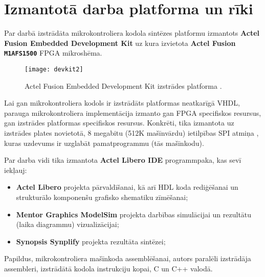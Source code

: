 \section{Izmantotā darba platforma un rīki} \label{sec:devkit}
Par darbā izstrādāta mikrokontroliera kodola sintēzes platformu izmantots
\textbf{Actel Fusion Embedded Development Kit} uz kura izvietota
\textbf{Actel Fusion \texttt{M1AFS1500}} FPGA mikroshēma.

\begin{figure}[thb]
	\centering
	\texttt{[image: devkit2]}
	\caption[Actel Fusion Embedded Development Kit izstrādes platforma.]
			{Actel Fusion Embedded Development Kit izstrādes platforma \cite[7.~lpp.]{FusionGuide}.}
	\label{fig:devkit}
\end{figure}

Lai gan mikrokontroliera kodols ir izstrādāts platformas neatkarīgā VHDL,
parauga mikrokontroliera implementācija izmanto gan FPGA specifiskos
resursus, gan izstrādes platformas specifiskos resursus. Konkrēti, tika
izmantota uz izstrādes plates novietotā, 8 megabitu (512K mašīnvārdu)
ietilpības SPI  atmiņa \cite{FusionGuide}, kuras uzdevums ir uzglabāt 
pamatprogrammu (tās mašīnkodu).

Par darba vidi tika izmantota \textbf{Actel Libero IDE} programmpaka, kas
sevī iekļauj:
\begin{itemize}
	\item \textbf{Actel Libero} projekta pārvaldīšanai,
		kā arī HDL koda rediģēšanai un strukturālo komponenšu 
		grafisko shematiku zīmēšanai;
	\item \textbf{Mentor Graphics ModelSim} projekta darbības simulācijai
		un rezultātu (laika diagrammu) vizualizācijai;
	\item \textbf{Synopsis Synplify} projekta rezultāta sintēzei;
\end{itemize}

Papildus, mikrokontroliera mašīnkoda assemblēšanai, autors paralēli
izstrādāja assembleri, izstrādātā kodola instrukciju kopai, C un C++ valodā.
